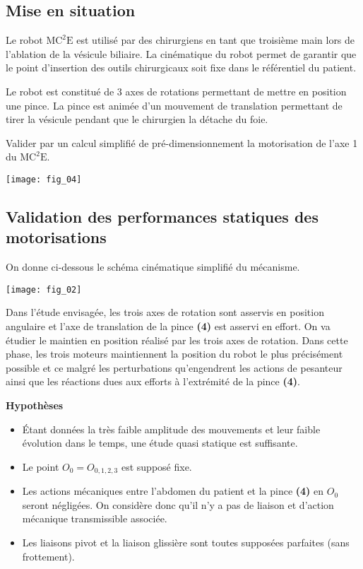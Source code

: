 \ifprof
\else
\begin{multicols}{2}
\fi
\section*{Mise en situation}
\ifprof
\else
Le robot $\text{MC}^2\text{E}$ est utilisé par des chirurgiens en tant que troisième main lors de l'ablation de la vésicule biliaire. La cinématique du robot permet de garantir que le point d'insertion des outils chirurgicaux soit fixe dans le référentiel du patient. 

Le robot est constitué de 3 axes de rotations permettant de mettre en position une pince. La pince est animée d'un mouvement de translation permettant de tirer la vésicule pendant que le chirurgien la détache du foie. 


\begin{obj}
Valider par un calcul simplifié de pré-dimensionnement la motorisation de l'axe 1 du  $\text{MC}^2\text{E}$.

\end{obj}


\begin{center}
\texttt{[image: fig\_04]}
\end{center}

\subsection*{Validation des performances statiques des motorisations}
On donne ci-dessous le schéma cinématique simplifié du mécanisme.

\begin{center}
\texttt{[image: fig\_02]}
\end{center}

Dans l’étude envisagée, les trois axes de rotation sont asservis en position angulaire et l’axe de translation de la pince \textbf{(4)} est asservi en effort. On va étudier le maintien en position réalisé par les trois axes de rotation. Dans cette phase, les trois moteurs maintiennent la position du robot le plus précisément possible et ce malgré les perturbations qu’engendrent les actions de pesanteur ainsi que les réactions dues aux efforts à l’extrémité de la pince \textbf{(4)}.

\noindent\textbf{Hypothèses}
\begin{itemize}
\item Étant données la très faible amplitude des mouvements et leur faible évolution dans le temps, une étude quasi statique est suffisante.
\item Le point $O_0 = O_{0,1,2,3}$ est supposé fixe.
\item Les actions mécaniques entre l’abdomen du patient et la pince \textbf{(4)} en $O_0$ seront négligées. On considère donc qu’il n’y a pas de liaison et d’action mécanique transmissible associée.
\item Les liaisons pivot et la liaison glissière sont toutes supposées parfaites (sans frottement).
\end{itemize}


\end{multicols}
